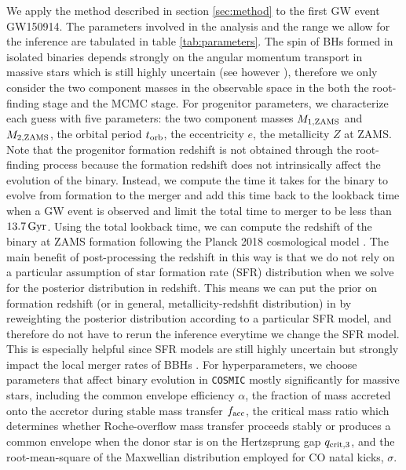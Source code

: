 \documentclass[twocolumn]{aastex631}
\begin{document}
We apply the method described in section \ref{sec:method} to the first GW event GW150914.
The parameters involved in the analysis and the range we allow for the inference are tabulated in table \ref{tab:parameters}.
The spin of BHs formed in isolated binaries depends strongly on the angular
momentum transport in massive stars which is still highly uncertain (see however \citet{Fuller2019, Bavera2020}),
therefore we only consider the two component masses in the observable space in the both the
root-finding stage and the MCMC stage. For progenitor parameters, we characterize each guess with
five parameters: the two component masses $M_{\rm 1,ZAMS}$ and $M_{\rm 2,ZAMS}$, the orbital period $t_{\rm orb}$,
the eccentricity $e$, the metallicity $Z$ at ZAMS. Note that the progenitor formation redshift is not
obtained through the root-finding process because the formation redshift does not intrinsically affect
the evolution of the binary. Instead, we compute the time it takes for the binary to evolve from
formation to the merger and add this time back to the lookback time when a GW event is observed and limit the total
time to merger to be less than $13.7\,\rm{Gyr}$.
Using the total lookback time, we can compute the redshift of the binary at ZAMS formation following the
Planck 2018 cosmological model \citep{Planck2018}.
The main benefit of post-processing the redshift in this way is that we do not rely on a particular assumption
of star formation rate (SFR) distribution when we solve for the posterior distribution in redshift.
This means we can put the prior on formation redshift (or in general, metallicity-redshfit distribution) in
by reweighting the posterior distribution according to a particular SFR model,
and therefore do not have to rerun the inference everytime we change the SFR model. This is especially helpful
since SFR models are still highly uncertain but strongly impact the local merger rates of BBHs \citep{Broekgaarden2021}.
For hyperparameters, we choose parameters that affect
binary evolution in \texttt{COSMIC} mostly significantly for massive stars, including the common envelope
efficiency $\alpha$, the fraction of mass accreted onto the accretor during stable mass transfer $f_{\rm acc}$,
the critical mass ratio which determines whether Roche-overflow mass transfer
proceeds stably or produces a common envelope when the donor star is on the Hertzsprung gap
$q_{\rm crit,3}$, and the root-mean-square of the Maxwellian distribution
employed for CO natal kicks, $\sigma$.
\end{document}
